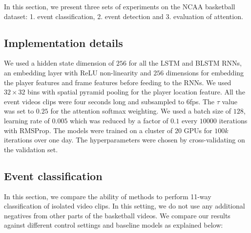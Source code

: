In this section, we present three sets of experiments on the NCAA basketball
dataset: 1. event classification, 2. event detection and 3. evaluation of
attention.

\subsection{Implementation details}

We used a hidden state dimension of $256$ for all the LSTM and BLSTM RNNs, an
embedding layer with ReLU non-linearity and $256$ dimensions for embedding the
player features and frame features before feeding to the RNNs.  We used $32
\times 32$ bins with spatial pyramid pooling for the player location feature.
All the event videos clips were four seconds long and subsampled to 6fps.  The
$\tau$ value was set to $0.25$ for the attention softmax weighting. We used a
batch size of $128$, learning rate of $0.005$ which was reduced by a factor of
$0.1$ every $10000$ iterations with RMSProp\cite{RMSProp}. The models were
trained on a cluster of $20$ GPUs for $100k$ iterations over one day.  The
hyperparameters were chosen by cross-validating on the validation set.

\subsection{Event classification}

In this section, we compare the ability of methods to perform 11-way classification of isolated video clips.
In this setting, we do not use any
additional negatives from other parts of the basketball videos.
We compare our results
against different control settings and baseline models as explained
below:

